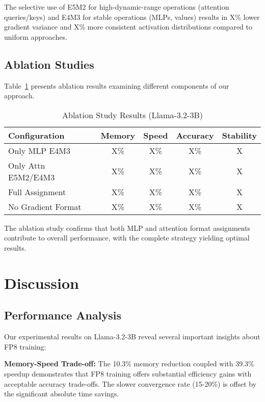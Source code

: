 \documentclass[conference]{IEEEtran}
\begin{document}
The selective use of E5M2 for high-dynamic-range operations (attention queries/keys) and E4M3 for stable operations (MLPs, values) results in X\% lower gradient variance and X\% more consistent activation distributions compared to uniform approaches.

\subsection{Ablation Studies}

Table~\ref{tab:ablation} presents ablation results examining different components of our approach.

\begin{table}[htbp]
\centering
\caption{Ablation Study Results (Llama-3.2-3B)}
\begin{tabular}{@{}lcccc@{}}
\toprule
\textbf{Configuration} & \textbf{Memory} & \textbf{Speed} & \textbf{Accuracy} & \textbf{Stability} \\
\midrule
Only MLP E4M3 & X\% & X\% & X\% & X \\
Only Attn E5M2/E4M3 & X\% & X\% & X\% & X \\
Full Assignment & X\% & X\% & X\% & X \\
No Gradient Format & X\% & X\% & X\% & X \\
\bottomrule
\end{tabular}
\label{tab:ablation}
\end{table}

The ablation study confirms that both MLP and attention format assignments contribute to overall performance, with the complete strategy yielding optimal results.
\section{Discussion}

\subsection{Performance Analysis}

Our experimental results on Llama-3.2-3B reveal several important insights about FP8 training:

\textbf{Memory-Speed Trade-off:} The 10.3\% memory reduction coupled with 39.3\% speedup demonstrates that FP8 training offers substantial efficiency gains with acceptable accuracy trade-offs. The slower convergence rate (15-20\%) is offset by the significant absolute time savings.
\end{document}
